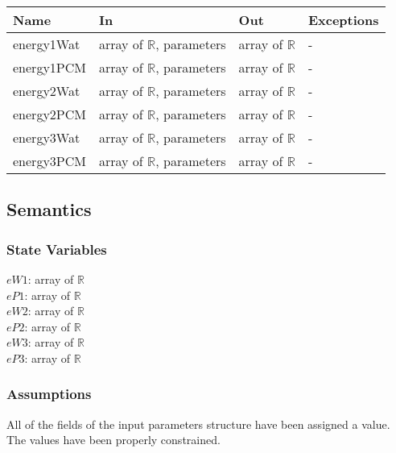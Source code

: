 \documentclass[12pt]{article}
\begin{document}
\begin{center}
\begin{tabular}{p{3cm} p{6cm} p{3cm} p{2cm}}
\hline
\textbf{Name} & \textbf{In} & \textbf{Out} & \textbf{Exceptions} \\
\hline
energy1Wat & array of $\mathbb{R}$, parameters & array of $\mathbb{R}$ & - \\
\hline
energy1PCM & array of $\mathbb{R}$, parameters & array of $\mathbb{R}$ & - \\
\hline
energy2Wat & array of $\mathbb{R}$, parameters & array of $\mathbb{R}$ & - \\
\hline
energy2PCM & array of $\mathbb{R}$, parameters & array of $\mathbb{R}$ & - \\
\hline
energy3Wat & array of $\mathbb{R}$, parameters & array of $\mathbb{R}$ & - \\
\hline
energy3PCM & array of $\mathbb{R}$, parameters & array of $\mathbb{R}$ & - \\
\hline
\end{tabular}
\end{center}

\subsection{Semantics}

\subsubsection{State Variables}

$eW1$: array of $\mathbb{R}$ \\
$eP1$: array of $\mathbb{R}$ \\
$eW2$: array of $\mathbb{R}$ \\
$eP2$: array of $\mathbb{R}$ \\
$eW3$: array of $\mathbb{R}$ \\
$eP3$: array of $\mathbb{R}$ 

\subsubsection{Assumptions}

All of the fields of the input parameters structure have been assigned a value. The values have been properly constrained.
\end{document}
